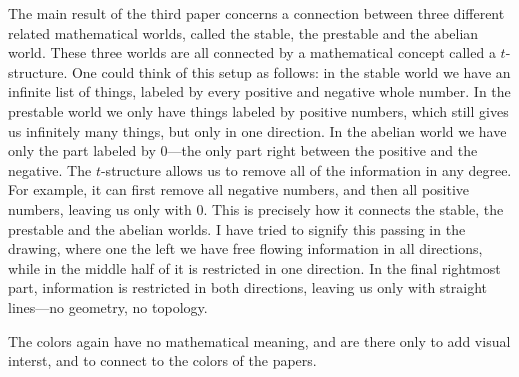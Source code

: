 The main result of the third paper concerns a connection between three different related mathematical worlds, called the stable, the prestable and the abelian world. These three worlds are all connected by a mathematical concept called a $t$-structure. One could think of this setup as follows: in the stable world we have an infinite list of things, labeled by every positive and negative whole number. In the prestable world we only have things labeled by positive numbers, which still gives us infinitely many things, but only in one direction. In the abelian world we have only the part labeled by $0$---the only part right between the positive and the negative. The $t$-structure allows us to remove all of the information in any degree. For example, it can first remove all negative numbers, and then all positive numbers, leaving us only with $0$. This is precisely how it connects the stable, the prestable and the abelian worlds. I have tried to signify this passing in the drawing, where one the left we have free flowing information in all directions, while in the middle half of it is restricted in one direction. In the final rightmost part, information is restricted in both directions, leaving us only with straight lines---no geometry, no topology. 

The colors again have no mathematical meaning, and are there only to add visual interst, and to connect to the colors of the papers. 

\newpage